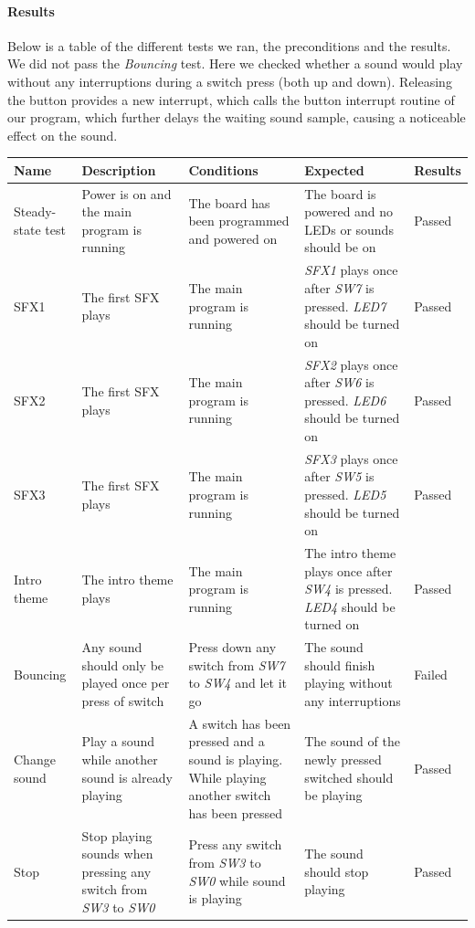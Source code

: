 \documentclass[a4paper,11pt]{article}
\begin{document}
\paragraph{Results}
Below is a table of the different tests we ran, the preconditions and the results. We did not pass the \emph{Bouncing} test. Here we checked whether a sound would play without any interruptions during a switch press (both up and down). Releasing the button provides a new interrupt, which calls the button interrupt routine of our program, which further delays the waiting sound sample, causing a noticeable effect on the sound.

\begin{center}
\footnotesize
\renewcommand{\arraystretch}{1.25} %
\begin{tabular}[pos]{|m{45pt}|m{80pt}|m{90pt}|m{105pt}|m{60pt}|}
\hline  \textbf{Name} & \textbf{Description} & \textbf{Conditions} & \textbf{Expected} & \textbf{Results} \\ 

\hline Steady-state test & Power is on and the main program is running & The board has been programmed and powered on & The board is powered and no LEDs or sounds should be on & Passed \\

\hline SFX1 & The first SFX plays & The main program is running & \emph{SFX1} plays once after \emph{SW7} is pressed. \emph{LED7} should be turned on & Passed \\

\hline SFX2 & The first SFX plays & The main program is running & \emph{SFX2} plays once after \emph{SW6} is pressed. \emph{LED6} should be turned on & Passed \\

\hline SFX3 & The first SFX plays & The main program is running & \emph{SFX3} plays once after \emph{SW5} is pressed. \emph{LED5} should be turned on & Passed \\ 

\hline Intro theme & The intro theme plays & The main program is running & The intro theme plays once after \emph{SW4} is pressed. \emph{LED4} should be turned on & Passed \\

\hline Bouncing & Any sound should only be played once per press of switch & Press down any switch from \emph{SW7} to \emph{SW4} and let it go & The sound should finish playing without any interruptions & Failed \\

\hline Change sound & Play a sound while another sound is already playing & A switch has been pressed and a sound is playing. While playing another switch has been pressed & The sound of the newly pressed switched should be playing & Passed \\ 

\hline Stop & Stop playing sounds when pressing any switch from \emph{SW3} to \emph{SW0} & Press any switch from \emph{SW3} to \emph{SW0} while sound is playing & The sound should stop playing & Passed \\ 

\hline 
\end{tabular} 
\end{center}
\end{document}

